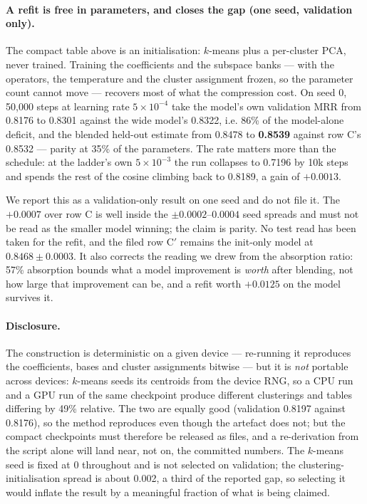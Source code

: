 \documentclass[11pt,a4paper]{article}
\begin{document}
\paragraph{A refit is free in parameters, and closes the gap (one seed,
validation only).} The compact table above is an initialisation: $k$-means plus
a per-cluster PCA, never trained. Training the coefficients and the subspace
banks --- with the operators, the temperature and the cluster assignment frozen,
so the parameter count cannot move --- recovers most of what the compression
cost. On seed 0, 50{,}000 steps at learning rate $5\times10^{-4}$ take the
model's own validation MRR from 0.8176 to 0.8301 against the wide model's
0.8322, i.e. 86\% of the model-alone deficit, and the blended held-out estimate
from 0.8478 to \textbf{0.8539} against row C's 0.8532 --- parity at 35\% of the
parameters. The rate matters more than the schedule: at the ladder's own
$5\times10^{-3}$ the run collapses to 0.7196 by 10k steps and spends the rest of
the cosine climbing back to 0.8189, a gain of $+0.0013$.

We report this as a validation-only result on one seed and do not file it. The
$+0.0007$ over row C is well inside the $\pm0.0002$--$0.0004$ seed spreads and
must not be read as the smaller model winning; the claim is parity. No test read
has been taken for the refit, and the filed row C$'$ remains the init-only
model at $0.8468\pm0.0003$. It also corrects the reading we drew from the
absorption ratio: 57\% absorption bounds what a model improvement is \emph{worth}
after blending, not how large that improvement can be, and a refit worth
$+0.0125$ on the model survives it.

\paragraph{Disclosure.} The construction is deterministic on a given
device --- re-running it reproduces the coefficients, bases and cluster
assignments bitwise --- but it is \emph{not} portable across devices:
$k$-means seeds its centroids from the device RNG, so a CPU run and a GPU
run of the same checkpoint produce different clusterings and tables
differing by 49\% relative. The two are equally good (validation 0.8197
against 0.8176), so the method reproduces even though the artefact does
not; but the compact checkpoints must therefore be released as files, and
a re-derivation from the script alone will land near, not on, the
committed numbers. The $k$-means seed is fixed at 0 throughout and is not
selected on validation; the clustering-initialisation spread is about
0.002, a third of the reported gap, so selecting it would inflate the
result by a meaningful fraction of what is being claimed.
\end{document}
